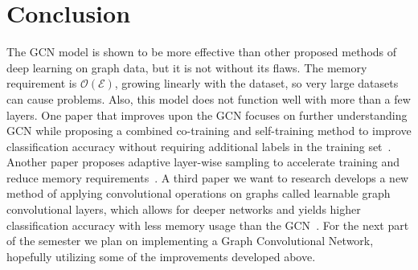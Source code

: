 \section{Conclusion}

The GCN model is shown to be more effective than other proposed methods of deep learning on graph data, but it is not without its flaws. The memory requirement is $\mathcal{O}(\mathcal{E})$, growing linearly with the dataset, so very large datasets can cause problems. Also, this model does not function well with more than a few layers. One paper that improves upon the GCN focuses on further understanding GCN while proposing a combined co-training and self-training method to improve classification accuracy without requiring additional labels in the training set~\cite{Li2018}. Another paper proposes adaptive layer-wise sampling to accelerate training and reduce memory requirements~\cite{Huang2018}. A third paper we want to research develops a new method of applying convolutional operations on graphs called learnable graph convolutional layers, which allows for deeper networks and yields higher classification accuracy with less memory usage than the GCN~\cite{Gao2018}. For the next part of the semester we plan on implementing a Graph Convolutional Network, hopefully utilizing some of the improvements developed above. 